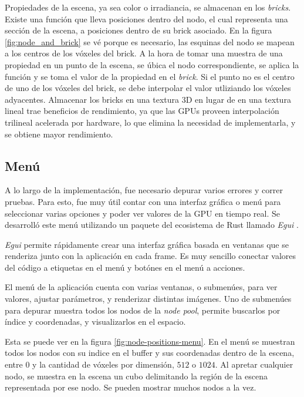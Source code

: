 Propiedades de la escena, ya sea color o irradiancia, se almacenan en los \textit{bricks}.
Existe una función que lleva posiciones dentro del nodo, el cual representa una sección de la escena, a posiciones dentro de su brick asociado.
En la figura \ref{fig:node_and_brick} se vé porque es necesario, las esquinas del nodo se mapean a los centros de los vóxeles del brick.
A la hora de tomar una muestra de una propiedad en un punto de la escena, se úbica el nodo correspondiente, se aplica la función y se toma el valor de la propiedad en el \textit{brick}.
Si el punto no es el centro de uno de los vóxeles del brick, se debe interpolar el valor utliziando los vóxeles adyacentes.
Almacenar los bricks en una textura 3D en lugar de en una textura lineal trae beneficios de rendimiento, ya que las GPUs proveen interpolación trilineal acelerada por hardware, lo que elimina la necesidad de implementarla, y se obtiene mayor rendimiento.

\subsection{Menú}

A lo largo de la implementación, fue necesario depurar varios errores y correr pruebas.
Para esto, fue muy útil contar con una interfaz gráfica o menú para seleccionar varias opciones y poder ver valores de la GPU en tiempo real.
Se desarrolló este menú utilizando un paquete del ecosistema de Rust llamado \textit{Egui} \cite{egui}.

\textit{Egui} permite rápidamente crear una interfaz gráfica basada en ventanas que se renderiza junto con la aplicación en cada frame.
Es muy sencillo conectar valores del código a etiquetas en el menú y botónes en el menú a acciones.

El menú de la aplicación cuenta con varias ventanas, o submenúes, para ver valores, ajustar parámetros, y renderizar distintas imágenes.
Uno de submenúes para depurar muestra todos los nodos de la \textit{node pool}, permite buscarlos por índice y coordenadas, y visualizarlos en el espacio.

Esta se puede ver en la figura \ref{fig:node-positions-menu}.
En el menú se muestran todos los nodos con su indice en el buffer y sus coordenadas dentro de la escena, entre $0$ y la cantidad de vóxeles por dimensión, $512$ o $1024$.
Al apretar cualquier nodo, se muestra en la escena un cubo delimitando la región de la escena representada por ese nodo.
Se pueden mostrar muchos nodos a la vez.

